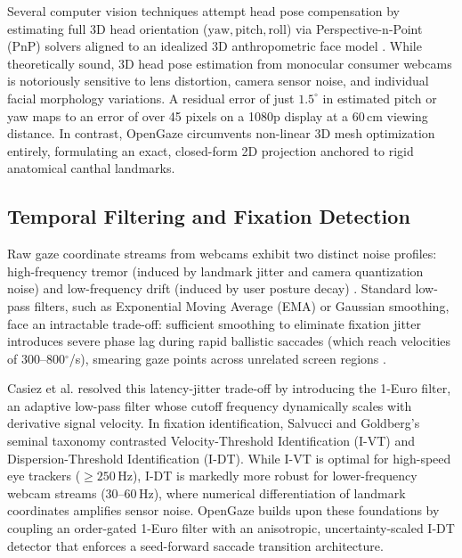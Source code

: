 \documentclass[10pt,twocolumn]{article}
\begin{document}
Several computer vision techniques attempt head pose compensation by estimating full 3D head orientation ($\text{yaw}, \text{pitch}, \text{roll}$) via Perspective-n-Point (PnP) solvers aligned to an idealized 3D anthropometric face model \cite{sugano2014learning,zhang2015appearance}. While theoretically sound, 3D head pose estimation from monocular consumer webcams is notoriously sensitive to lens distortion, camera sensor noise, and individual facial morphology variations. A residual error of just $1.5^\circ$ in estimated pitch or yaw maps to an error of over 45 pixels on a 1080p display at a 60\,cm viewing distance. In contrast, OpenGaze circumvents non-linear 3D mesh optimization entirely, formulating an exact, closed-form 2D projection anchored to rigid anatomical canthal landmarks.

\subsection{Temporal Filtering and Fixation Detection}
Raw gaze coordinate streams from webcams exhibit two distinct noise profiles: high-frequency tremor (induced by landmark jitter and camera quantization noise) and low-frequency drift (induced by user posture decay) \cite{holmqvist2011eye}. Standard low-pass filters, such as Exponential Moving Average (EMA) or Gaussian smoothing, face an intractable trade-off: sufficient smoothing to eliminate fixation jitter introduces severe phase lag during rapid ballistic saccades (which reach velocities of 300--800$^\circ$/s), smearing gaze points across unrelated screen regions \cite{casiez20121}.

Casiez et al. \cite{casiez20121} resolved this latency-jitter trade-off by introducing the 1-Euro filter, an adaptive low-pass filter whose cutoff frequency dynamically scales with derivative signal velocity. In fixation identification, Salvucci and Goldberg's seminal taxonomy \cite{salvucci2000identifying} contrasted Velocity-Threshold Identification (I-VT) and Dispersion-Threshold Identification (I-DT). While I-VT is optimal for high-speed eye trackers ($\ge 250\,$Hz), I-DT is markedly more robust for lower-frequency webcam streams ($30\text{--}60\,$Hz), where numerical differentiation of landmark coordinates amplifies sensor noise. OpenGaze builds upon these foundations by coupling an order-gated 1-Euro filter with an anisotropic, uncertainty-scaled I-DT detector that enforces a seed-forward saccade transition architecture.
\end{document}

